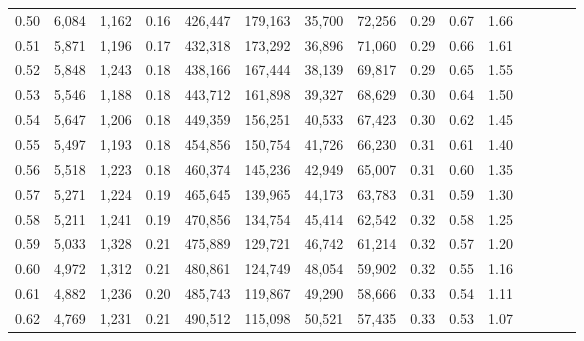 \begin{tabular}{rrrcrrrrrrrrrrr}
0.50 &   6,084 &   1,162 &                                       0.16 &  426,447 &  179,163 &   35,700 &   72,256 &  0.29 &  0.67 &                         1.66 \\
0.51 &   5,871 &   1,196 &                                       0.17 &  432,318 &  173,292 &   36,896 &   71,060 &  0.29 &  0.66 &                         1.61 \\
0.52 &   5,848 &   1,243 &                                       0.18 &  438,166 &  167,444 &   38,139 &   69,817 &  0.29 &  0.65 &                         1.55 \\
0.53 &   5,546 &   1,188 &                                       0.18 &  443,712 &  161,898 &   39,327 &   68,629 &  0.30 &  0.64 &                         1.50 \\
0.54 &   5,647 &   1,206 &                                       0.18 &  449,359 &  156,251 &   40,533 &   67,423 &  0.30 &  0.62 &                         1.45 \\
0.55 &   5,497 &   1,193 &                                       0.18 &  454,856 &  150,754 &   41,726 &   66,230 &  0.31 &  0.61 &                         1.40 \\
0.56 &   5,518 &   1,223 &                                       0.18 &  460,374 &  145,236 &   42,949 &   65,007 &  0.31 &  0.60 &                         1.35 \\
0.57 &   5,271 &   1,224 &                                       0.19 &  465,645 &  139,965 &   44,173 &   63,783 &  0.31 &  0.59 &                         1.30 \\
0.58 &   5,211 &   1,241 &                                       0.19 &  470,856 &  134,754 &   45,414 &   62,542 &  0.32 &  0.58 &                         1.25 \\
0.59 &   5,033 &   1,328 &                                       0.21 &  475,889 &  129,721 &   46,742 &   61,214 &  0.32 &  0.57 &                         1.20 \\
0.60 &   4,972 &   1,312 &                                       0.21 &  480,861 &  124,749 &   48,054 &   59,902 &  0.32 &  0.55 &                         1.16 \\
0.61 &   4,882 &   1,236 &                                       0.20 &  485,743 &  119,867 &   49,290 &   58,666 &  0.33 &  0.54 &                         1.11 \\
0.62 &   4,769 &   1,231 &                                       0.21 &  490,512 &  115,098 &   50,521 &   57,435 &  0.33 &  0.53 &                         1.07 \\

\end{tabular}
